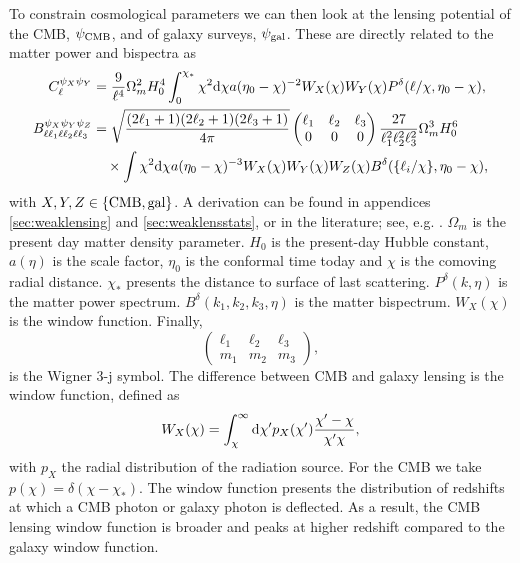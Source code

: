 \documentclass[11pt]{article} %
\DeclareRobustCommand{\d}{\ifmmode\text{d}\else d\fi}
\DeclareRobustCommand{\CMB}{\ifmmode\text{CMB}\else d\fi}
\DeclareRobustCommand{\gal}{\ifmmode\text{gal}\else d\fi}
\begin{document}
To constrain cosmological parameters we can then look at the lensing potential of the CMB, $\psi_\CMB$, and of galaxy surveys, $\psi_\gal$. These are directly related to the matter power and bispectra as
\begin{align}%
    C^{\psi_X\psi_Y}_\ell
    & = \frac{9}{\ell^4}\Omega_m^2H_0^4\int_0^{\chi_*} \chi^2 \d\chi a(\eta_0-\chi)^{-2}W_X(\chi)W_Y(\chi)P^\delta(\ell/\chi,\eta_0-\chi), \label{eq:lensingpowerspectrum}\\
    B^{\psi_X\psi_Y\psi_Z}_{\ell\ell_1\ell\ell_2\ell\ell_3} &= \sqrt{\frac{(2\ell_1 + 1)(2\ell_2 + 1)(2\ell_3 + 1)}{4\pi}} \begin{pmatrix} \ell_1 & \ell_2 & \ell_3 \\ 0 & 0 & 0 \end{pmatrix} \frac{27}{\ell_1^2\ell_2^2\ell_3^2}\Omega_m^3H_0^6 \notag\\
    & \quad \times \int \chi^2\d \chi a(\eta_0-\chi)^{-3}W_X(\chi)W_Y(\chi)W_Z(\chi)  B^\delta(\{\ell_i/\chi\}, \eta_0-\chi), \label{eq:lensingbispectrum}
\end{align}
with $X, Y, Z \in \{\CMB, \gal\}$. A derivation can be found in appendices \ref{sec:weaklensing} and \ref{sec:weaklensstats}, or in the literature; see, e.g. \cite{bartelmann2001weak}. $\Omega_m$ is the present day matter density parameter. $H_0$ is the present-day Hubble constant, $a(\eta)$ is the scale factor, $\eta_0$ is the conformal time today and $\chi$ is the comoving radial distance. $\chi_*$ presents the distance to surface of last scattering. $P^\delta(k, \eta)$ is the matter power spectrum. $B^\delta(k_1, k_2, k_3, \eta)$ is the matter bispectrum. $W_X(\chi)$ is the window function. Finally,
$$
\begin{pmatrix}
    \ell_1&\ell_2&\ell_3 \\ m_1 & m_2 & m_3
\end{pmatrix},
$$ 
is the Wigner 3-j symbol. The difference between CMB and galaxy lensing is the window function, defined as
\begin{equation}
    W_X(\chi) = \int_\chi^{\infty}\d\chi' p_X(\chi')\frac{\chi'-\chi}{\chi'\chi},
    \label{eq:windowfuncdef}
\end{equation}
with $p_X$ the radial distribution of the radiation source. For the CMB we take $p(\chi) = \delta(\chi - \chi_*)$. The window function presents the distribution of redshifts at which a CMB photon or galaxy photon is deflected. As a result, the CMB lensing window function is broader and peaks at higher redshift compared to the galaxy window function.
\end{document}
